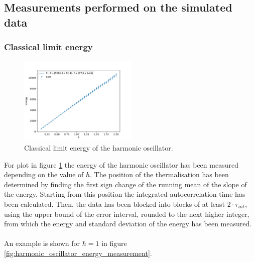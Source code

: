 \documentclass{scrartcl}
\begin{document}
	\subsection{Measurements performed on the simulated data}
	\label{sec:measurements}
	\subsubsection{Classical limit energy}
		\begin{figure}[H]
			\centering
				\includegraphics[width=0.5\textwidth]{../imgs/harmonic_oscillator_classical_limit_energy/harmonic_oscillator_10_classical_limit_energy.pdf}
			\caption{Classical limit energy of the harmonic oscillator.}
			\label{fig:harmonic_oscillator_classical_limit_energy}
		\end{figure}
		For plot in figure \ref{fig:harmonic_oscillator_classical_limit_energy} the energy of the harmonic oscillator has been measured depending on the value of $\hbar$.
		The position of the thermalisation has been determined by finding the first sign change of the running mean of the slope of the energy.
		Starting from this position the integrated autocorrelation time has been calculated.
		Then, the data has been blocked into blocks of at least $2 \cdot \tau_{int}$, using the upper bound of the error interval, rounded to the next higher integer, from which the energy and standard deviation of the energy has been measured.
		\\\\
		An example is shown for $\hbar = 1$ in figure \ref{fig:harmonic_oscillator_energy_measurement}.
\end{document}
